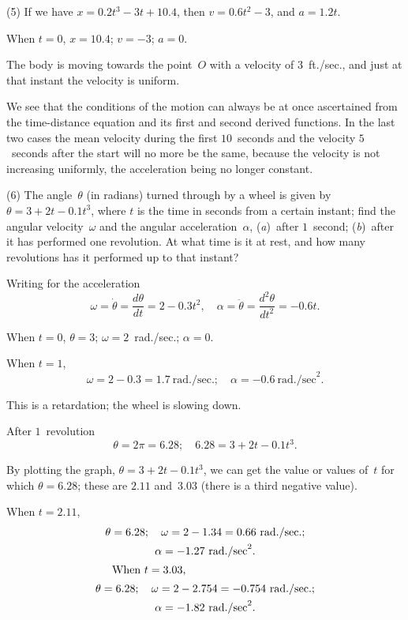 \documentclass[12pt]{book}[2005/09/16]
\newcommand{\DPPageSep}[2]{\Pagelabel{#2}}
\newcommand{\Pagelabel}[1]
  {\phantomsection\label{#1}}
\begin{document}
(5) If we have $x = 0.2t^3 - 3t + 10.4$, then $v = 0.6t^2 - 3$,
and $a = 1.2t$.

When $t = 0$, $x = 10.4$; $v = -3$; $a = 0$.

The body is moving towards the point~$O$ with
\DPPageSep{075.png}{63}%
a velocity of $3$~ft./sec., and just at that instant the
velocity is uniform.

We see that the conditions of the motion can always
be at once ascertained from the time-distance equation
and its first and second derived functions. In the
last two cases the mean velocity during the first
$10$~seconds and the velocity $5$~seconds after the start
will no more be the same, because the velocity is not
increasing uniformly, the acceleration being no longer
constant.

(6) The angle~$\theta$ (in radians) turned through by a
wheel is given by $\theta = 3 + 2t - 0.1t^3$, where $t$ is the
time in seconds from a certain instant; find the
angular velocity~$\omega$ and the angular acceleration~$\alpha$,
(\textit{a})~after $1$~second; (\textit{b})~after it has performed one
revolution. At what time is it at rest, and how many
revolutions has it performed up to that instant?

Writing for the acceleration
\[
\omega =  \dot{\theta} = \dfrac{d\theta}{dt} = 2 - 0.3t^2,\quad
\alpha = \ddot{\theta} = \dfrac{d^2\theta}{dt^2} = -0.6t.
\]

When $t = 0$, $\theta = 3$; $\omega = 2$~rad./sec.; $\alpha = 0$.

When $t = 1$,
\[
\omega = 2 - 0.3 = 1.7~\text{rad./sec.};\quad \alpha = -0.6~\text{rad./sec}^2.
\]

This is a retardation; the wheel is slowing down.

After $1$~revolution
\[
\theta = 2\pi = 6.28;\quad 6.28 = 3 + 2t - 0.1t^3.
\]

By plotting the graph, $\theta = 3 + 2t - 0.1t^3$, we can get
the value or values of~$t$ for which $\theta = 6.28$; these
are $2.11$ and~$3.03$ (there is a third negative value).
\DPPageSep{076.png}{64}%

When $t = 2.11$,
\begin{gather*}
\theta = 6.28;\quad\omega = 2 - 1.34 = 0.66 \text{ rad./sec.}; \\
\alpha = -1.27 \text{ rad./sec}^2. \\
\intertext{\indent When $t = 3.03$,}
\theta = 6.28;\quad \omega = 2 - 2.754 = -0.754 \text{ rad./sec.}; \\
\alpha = -1.82 \text{ rad./sec}^2.
\end{gather*}
\end{document}
